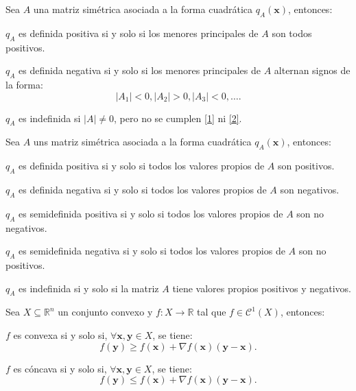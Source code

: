 \documentclass[8pt,a4paper]{extarticle}
\begin{document}
\begin{multicols}{3}
	\newpage

	\begin{boxtheo}
		Sea $A$ una matriz simétrica asociada a la forma cuadrática $q_A(\mathbf{x})$, entonces:
		\begin{eqlist}
			\item\label{1}$q_A$ es definida positiva si y solo si los menores principales de $A$ son todos positivos.
			\item\label{2} $q_A$ es definida negativa si y solo si los menores principales de $A$ alternan signos de la forma:
			\[
				\left| A_1 \right| < 0, \left| A_2 \right| > 0, \left| A_3 \right| < 0, \ldots
				.\]
			\item $q_A$ es indefinida si $\left| A \right| \neq 0$, pero no se cumplen \ref{1} ni \ref{2}.
		\end{eqlist}
	\end{boxtheo}

	\begin{boxtheo}
		Sea $A$ uns matriz simétrica asociada a la forma cuadrática $q_A(\mathbf{x})$, entonces:
		\begin{eqlist}
			\item $q_A$ es definida positiva si y solo si todos los valores propios de $A$ son positivos.
			\item $q_A$ es definida negativa si y solo si todos los valores propios de $A$ son negativos.
			\item $q_A$ es semidefinida positiva si y solo si todos los valores propios de $A$ son no negativos.
			\item $q_A$ es semidefinida negativa si y solo si todos los valores propios de $A$ son no positivos.
			\item $q_A$ es indefinida si y solo si la matriz $A$ tiene valores propios positivos y negativos.
		\end{eqlist}
	\end{boxtheo}

	\begin{boxtheo}
		Sea $X \subseteq \mathbb{R}^n$ un conjunto convexo y $f : X \to \mathbb{R}$ tal que $f \in \mathcal{C}^1(X)$, entonces:
		\begin{eqlist}
			\item $f$ es convexa si y solo si, $\forall \mathbf{x}, \mathbf{y} \in X$, se tiene:
			\[
				f(\mathbf{y}) \ge f(\mathbf{x}) + \nabla f(\mathbf{x})(\mathbf{y} - \mathbf{x})
				.\]
			\item $f$ es cóncava si y solo si, $\forall \mathbf{x}, \mathbf{y} \in X$, se tiene:
			\[
				f(\mathbf{y}) \le f(\mathbf{x}) + \nabla f(\mathbf{x})(\mathbf{y} - \mathbf{x})
				.\]
		\end{eqlist}
	\end{boxtheo}


\end{multicols}
\end{document}
